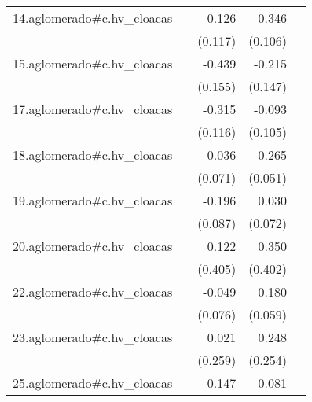 {\begin{longtable}{l*{4}{D{.}{.}{-1}}}
\addlinespace
14.aglomerado#c.hv\_cloacas&                     &       0.126         &       0.346\sym{**} &                     \\
            &                     &     (0.117)         &     (0.106)         &                     \\
\addlinespace
15.aglomerado#c.hv\_cloacas&                     &      -0.439\sym{**} &      -0.215         &                     \\
            &                     &     (0.155)         &     (0.147)         &                     \\
\addlinespace
17.aglomerado#c.hv\_cloacas&                     &      -0.315\sym{**} &      -0.093         &                     \\
            &                     &     (0.116)         &     (0.105)         &                     \\
\addlinespace
18.aglomerado#c.hv\_cloacas&                     &       0.036         &       0.265\sym{***}&                     \\
            &                     &     (0.071)         &     (0.051)         &                     \\
\addlinespace
19.aglomerado#c.hv\_cloacas&                     &      -0.196\sym{*}  &       0.030         &                     \\
            &                     &     (0.087)         &     (0.072)         &                     \\
\addlinespace
20.aglomerado#c.hv\_cloacas&                     &       0.122         &       0.350         &                     \\
            &                     &     (0.405)         &     (0.402)         &                     \\
\addlinespace
22.aglomerado#c.hv\_cloacas&                     &      -0.049         &       0.180\sym{**} &                     \\
            &                     &     (0.076)         &     (0.059)         &                     \\
\addlinespace
23.aglomerado#c.hv\_cloacas&                     &       0.021         &       0.248         &                     \\
            &                     &     (0.259)         &     (0.254)         &                     \\
\addlinespace
25.aglomerado#c.hv\_cloacas&                     &      -0.147         &       0.081         &                     \\

\end{longtable}}
